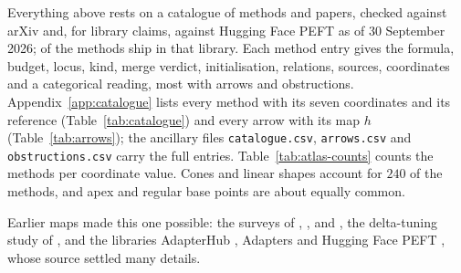 Everything above rests on a catalogue of \nMethods{} methods and \nPapers{} papers, checked against arXiv and, for
library claims, against Hugging Face PEFT \citep{xmangrulkar2022peft} as of 30 September 2026; \nHF{} of the methods
ship in that library. Each method entry gives the formula, budget, locus, kind, merge verdict, initialisation, relations,
sources, coordinates and a categorical reading, most with arrows and obstructions. Appendix~\ref{app:catalogue} lists
every method with its seven coordinates and its reference (Table~\ref{tab:catalogue}) and every arrow with its map $h$
(Table~\ref{tab:arrows}); the ancillary files \texttt{catalogue.csv}, \texttt{arrows.csv} and
\texttt{obstructions.csv} carry the full entries. Table~\ref{tab:atlas-counts} counts the methods per coordinate value.
Cones and linear shapes account for $240$ of the \nMethods{} methods, and apex and regular base points are about equally
common.

Earlier maps made this one possible: the surveys of \citet{lialin2023scaling}, \citet{xu2023parameter},
\citet{han2024parameter} and \citet{mao2024survey}, the delta-tuning study of \citet{ding2022parameter}, and the
libraries AdapterHub \citep{pfeiffer2020adapterhub}, Adapters \citep{poth2023adapters} and Hugging Face PEFT
\citep{xmangrulkar2022peft}, whose source settled many details.

